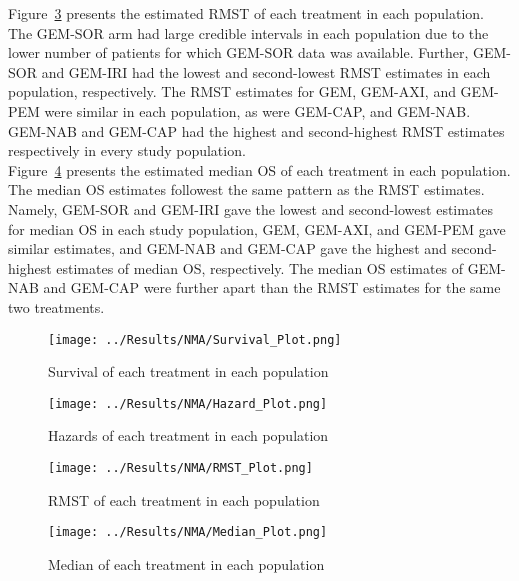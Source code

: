 Figure~\ref{fig:pred_rmst} presents the estimated RMST of each treatment in each population. The GEM-SOR arm had large credible intervals in each population due to the lower number of patients for which GEM-SOR data was available. Further, GEM-SOR and GEM-IRI had the lowest and second-lowest RMST estimates in each population, respectively. The RMST estimates for GEM, GEM-AXI, and GEM-PEM were similar in each population, as were GEM-CAP, and GEM-NAB. GEM-NAB and GEM-CAP had the highest and second-highest RMST estimates respectively in every study population. \\

Figure~\ref{fig:pred_median} presents the estimated median OS of each treatment in each population. The median OS estimates followest the same pattern as the RMST estimates. Namely, GEM-SOR and GEM-IRI gave the lowest and second-lowest estimates for median OS in each study population, GEM, GEM-AXI, and GEM-PEM gave similar estimates, and GEM-NAB and GEM-CAP gave the highest and second-highest estimates of median OS, respectively. The median OS estimates of GEM-NAB and GEM-CAP were further apart than the RMST estimates for the same two treatments. 

\begin{figure}[h]
    \centering
    \texttt{[image: ../Results/NMA/Survival\_Plot.png]}
    \caption{Survival of each treatment in each population}
    \label{fig:pred_surv}
\end{figure}

\begin{figure}[h]
    \centering
    \texttt{[image: ../Results/NMA/Hazard\_Plot.png]}
    \caption{Hazards of each treatment in each population}
    \label{fig:pred_hazard}
\end{figure}

\begin{figure}[h]
    \centering
    \texttt{[image: ../Results/NMA/RMST\_Plot.png]}
    \caption{RMST of each treatment in each population}
    \label{fig:pred_rmst}
\end{figure}

\begin{figure}[h]
    \centering
    \texttt{[image: ../Results/NMA/Median\_Plot.png]}
    \caption{Median of each treatment in each population}
    \label{fig:pred_median}
\end{figure}